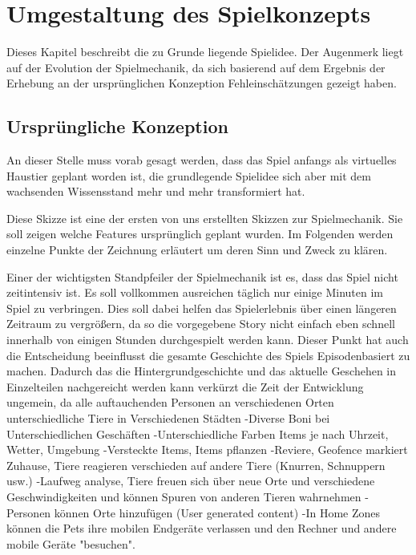 \chapter{Umgestaltung des Spielkonzepts}
\label{cha:umgestaltung_spielkonzept}
Dieses Kapitel beschreibt die zu Grunde liegende Spielidee. Der Augenmerk liegt auf der Evolution der Spielmechanik, da sich basierend auf dem Ergebnis der Erhebung an der ursprünglichen Konzeption Fehleinschätzungen gezeigt haben.


\section{Ursprüngliche Konzeption}
An dieser Stelle muss vorab gesagt werden, dass das Spiel anfangs als virtuelles Haustier geplant worden ist, die grundlegende Spielidee sich aber mit dem wachsenden Wissensstand mehr und mehr transformiert hat.
 
Diese Skizze ist eine der ersten von uns erstellten Skizzen zur Spielmechanik. Sie soll zeigen welche Features ursprünglich geplant wurden. Im Folgenden werden einzelne Punkte der Zeichnung erläutert um deren Sinn und Zweck zu klären.

Einer der wichtigsten Standpfeiler der Spielmechanik ist es, dass das Spiel nicht zeitintensiv ist. Es soll vollkommen ausreichen täglich nur einige Minuten im Spiel zu verbringen. Dies soll dabei helfen das Spielerlebnis über einen längeren Zeitraum zu vergrößern, da so die vorgegebene Story nicht einfach eben schnell innerhalb von einigen Stunden durchgespielt werden kann. Dieser Punkt hat auch die Entscheidung beeinflusst die gesamte Geschichte des Spiels Episodenbasiert zu machen. Dadurch das die Hintergrundgeschichte und das aktuelle Geschehen in Einzelteilen nachgereicht werden kann verkürzt die Zeit der Entwicklung ungemein, da alle auftauchenden Personen
an verschiedenen Orten unterschiedliche Tiere in Verschiedenen Städten 
-Diverse Boni bei Unterschiedlichen Geschäften
-Unterschiedliche Farben Items je nach Uhrzeit, Wetter, Umgebung
-Versteckte Items, Items pflanzen
-Reviere, Geofence markiert Zuhause, Tiere reagieren verschieden auf andere Tiere (Knurren, Schnuppern usw.)
-Laufweg analyse, Tiere freuen sich über neue Orte und verschiedene Geschwindigkeiten und können Spuren von anderen Tieren wahrnehmen
-Personen können Orte hinzufügen (User generated content)
-In Home Zones können die Pets ihre mobilen Endgeräte verlassen und den Rechner und andere mobile Geräte "besuchen".


